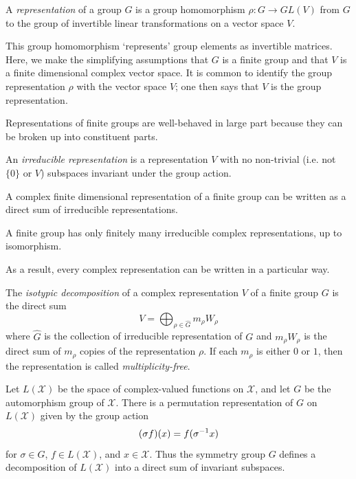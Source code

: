 \documentclass[cclicense]{hmcthesis}
\providecommand*{\xs}{\mathcal X}
\numberwithin{equation}{chapter}
\numberwithin{thmcounter}{chapter}
\begin{document}
    \begin{definition}
        A \emph{representation} of a group $G$ is a group homomorphism $\rho: G
        \to GL(V)$ from $G$ to the group of invertible linear transformations on
        a vector space $V$.  
    \end{definition}
    This group homomorphism `represents' group elements as invertible matrices.
    Here, we make the simplifying assumptions that $G$ is a finite group and
    that $V$ is a finite dimensional complex vector space.  It is common to
    identify the group representation $\rho$ with the vector space $V$; one then
    says that $V$ is the group representation.

    Representations of finite groups are well-behaved in large part because they
    can be broken up into constituent parts.
    \begin{definition}
        An \emph{irreducible representation} is a representation $V$ with no
        non-trivial (i.e. not $\{0\}$ or $V$) subspaces invariant under the
        group action.
    \end{definition}
    \begin{theorem}[Maschke]
        A complex finite dimensional representation of a finite group can be
        written as a direct sum of irreducible representations.
    \end{theorem}
    \begin{theorem}
        A finite group has only finitely many irreducible complex
        representations, up to isomorphism.
    \end{theorem}
    As a result, every complex representation can be written in a particular way.
    
    \begin{definition}
        The \emph{isotypic decomposition} of a complex representation $V$ of a
        finite group $G$ is the direct sum
        \[
            V = \bigoplus_{\rho \in \widehat{G}}  m_\rho W_\rho
        \]
        where $\widehat G$ is the collection of irreducible representation of
        $G$ and $m_\rho W_\rho$ is the direct sum of $m_\rho$ copies of the
        representation $\rho$.  If each $m_\rho$ is either $0$ or $1$, then the
        representation is called \emph{multiplicity-free}.
    \end{definition}

    Let $L(\xs)$ be the space of complex-valued functions on $\xs$, and let $G$
    be the automorphism group of $\xs$.  There is a permutation representation
    of $G$ on $L(\xs)$ given by the group action
    \[
        (\sigma f)(x) = f(\sigma^{-1} x)
    \]
    for $\sigma \in G$, $f \in L(\xs)$, and $x \in \xs$.  Thus the symmetry
    group $G$ defines a decomposition of $L(\xs)$ into a direct sum of invariant
    subspaces.
\end{document}

